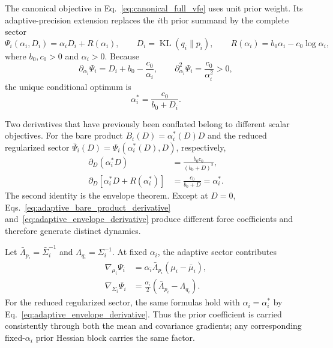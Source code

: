 \documentclass[12pt]{article}
\newcommand{\KL}{\operatorname{KL}}
\begin{document}
The canonical objective in Eq.~\eqref{eq:canonical_full_vfe} uses unit prior weight. Its adaptive-precision extension replaces the $i$th prior summand by the complete sector
\begin{equation}
\Psi_i(\alpha_i,D_i)
=\alpha_iD_i+R(\alpha_i),
\qquad
D_i=\KL(q_i\|p_i),
\qquad
R(\alpha_i)=b_0\alpha_i-c_0\log\alpha_i,
\label{eq:adaptive_self_coupling}
\end{equation}
where $b_0,c_0>0$ and $\alpha_i>0$. Because
\begin{equation}
\partial_{\alpha_i}\Psi_i
=D_i+b_0-\frac{c_0}{\alpha_i},
\qquad
\partial_{\alpha_i}^2\Psi_i=\frac{c_0}{\alpha_i^2}>0,
\end{equation}
the unique conditional optimum is
\begin{equation}
\boxed{\alpha_i^*=\frac{c_0}{b_0+D_i}.}
\label{eq:state_dependent_alpha}
\end{equation}

Two derivatives that have previously been conflated belong to different scalar objectives. For the bare product $B_i(D)=\alpha_i^*(D)D$ and the reduced regularized sector $\bar\Psi_i(D)=\Psi_i(\alpha_i^*(D),D)$, respectively,
\begin{align}
\partial_D(\alpha_i^*D)
&=\frac{b_0c_0}{(b_0+D)^2},
\label{eq:adaptive_bare_product_derivative}\\
\partial_D[\alpha_i^*D+R(\alpha_i^*)]
&=\frac{c_0}{b_0+D}=\alpha_i^*.
\label{eq:adaptive_envelope_derivative}
\end{align}
The second identity is the envelope theorem. Except at $D=0$, Eqs.~\eqref{eq:adaptive_bare_product_derivative} and~\eqref{eq:adaptive_envelope_derivative} produce different force coefficients and therefore generate distinct dynamics.

Let $\bar\Lambda_{p_i}=\bar\Sigma_i^{-1}$ and $\Lambda_{q_i}=\Sigma_i^{-1}$. At fixed $\alpha_i$, the adaptive sector contributes
\begin{align}
\nabla_{\mu_i}\Psi_i
&=\alpha_i\bar\Lambda_{p_i}(\mu_i-\bar\mu_i),
\label{eq:adaptive_prior_mean_gradient}\\
\nabla_{\Sigma_i}\Psi_i
&=\frac{\alpha_i}{2}(\bar\Lambda_{p_i}-\Lambda_{q_i}).
\label{eq:adaptive_prior_covariance_gradient}
\end{align}
For the reduced regularized sector, the same formulas hold with $\alpha_i=\alpha_i^*$ by Eq.~\eqref{eq:adaptive_envelope_derivative}. Thus the prior coefficient is carried consistently through both the mean and covariance gradients; any corresponding fixed-$\alpha_i$ prior Hessian block carries the same factor.
\end{document}
